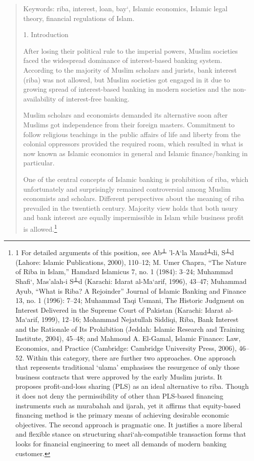  \begin{quote}

Keywords: riba, interest, loan, bay‘, Islamic economics, Islamic legal theory, financial regulations of Islam.

1. Introduction

After losing their political rule to the imperial powers, Muslim societies faced the widespread dominance of interest-based banking system. According to the majority of Muslim scholars and jurists, bank interest (riba) was not allowed, but Muslim societies got engaged in it due to growing spread of interest-based banking in modern societies and the non-availability of interest-free banking. 

Muslim scholars and economists demanded its alternative soon after Muslims got independence from their foreign masters. Commitment to follow religious teachings in the public affairs of life and liberty from the colonial oppressors provided the required room, which resulted in what is now known as Islamic economics in general and Islamic finance/banking in particular.

One of the central concepts of Islamic banking is prohibition of riba, which unfortunately and surprisingly remained controversial among Muslim economists and scholars. Different perspectives about the meaning of riba prevailed in the twentieth century. Majority view holds that both usury and bank interest are equally impermissible in Islam while business profit is allowed.\footnote{1 For  detailed  arguments  of  this  position,  see  Ab┴ ’l-A‘la  Maud┴di,  S┴d  (Lahore:  Islamic Publications,  2000),  110–12;  M.  Umer  Chapra,  “The  Nature  of  Riba  in  Islam,”  Hamdard Islamicus  7, no.  1 (1984):  3–24;  Muhammad  Shafi‘, Mas’alah-i  S┴d  (Karachi: Idarat  al-Ma‘arif, 1996), 43–47; Muhammad Ayub, “What  is Riba? A  Rejoinder” Journal of Islamic  Banking and Finance  13,  no.  1 (1996):  7–24;  Muhammad  Taqi Usmani,  The  Historic  Judgment  on Interest Delivered in the Supreme Court of Pakistan (Karachi: Idarat al-Ma‘arif, 1999), 12–16; Mohammad Nejatullah  Siddiqi,  Riba,  Bank  Interest  and  the  Rationale  of  Its  Prohibition  (Jeddah:  Islamic Research  and  Training  Institute, 2004),  45–48;  and  Mahmoud A.  El-Gamal,  Islamic  Finance: Law,  Economics,  and Practice  (Cambridge:  Cambridge University  Press, 2006),  46–52. Within this  category,  there  are  further  two  approaches.  One  approach  that  represents  traditional ‘ulama’ emphasises the resurgence  of only those business contracts that were approved by  the early  Muslim  jurists.  It proposes  profit-and-loss  sharing (PLS)  as an  ideal alternative  to riba. Though it does not deny the permissibility of other than PLS-based financing instruments such as murabahah and ijarah, yet it affirms that equity-based financing method is the primary means of achieving desirable economic objectives. The second approach is pragmatic one. It justifies a more liberal and flexible stance on structuring shari‘ah-compatible transaction forms that looks for financial engineering to meet all demands of modern banking customer.  }


\end{quote}
